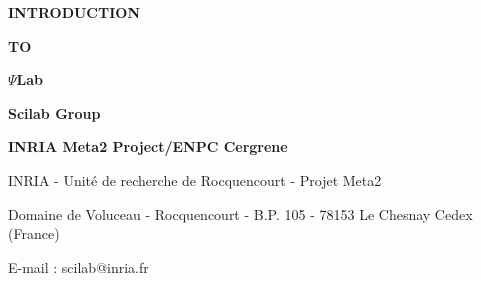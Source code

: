 
\pagestyle{empty}


\hspace*{-2.cm}

\newpage

\vspace{8.cm}

\Huge\bf  {INTRODUCTION}

\Huge\bf  {TO}

\Huge\bf  {$\Psi$Lab}



\vspace{3.cm}

\Huge\bf {Scilab Group}

\Large\bf
INRIA Meta2 Project/ENPC Cergrene

\normalsize

\vspace{12.cm}

INRIA - Unit\'e de recherche de Rocquencourt - Projet Meta2

Domaine de Voluceau - Rocquencourt - B.P. 105 - 78153 Le Chesnay Cedex (France)

E-mail : scilab@inria.fr

\newpage
\mbox{ }
\newpage

\normalsize
{}
\tableofcontents

\pagestyle{headings}

